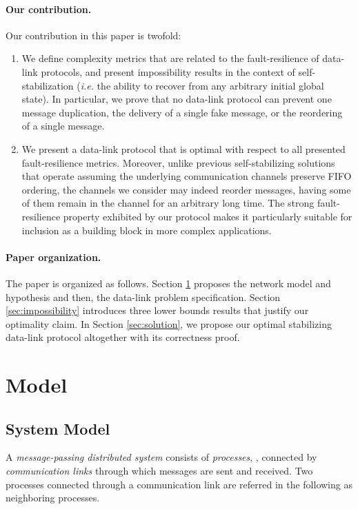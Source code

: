 \documentclass[11pt]{article}
\begin{document}
\paragraph{Our contribution.} Our contribution in this paper is twofold:
\begin{enumerate}
\item We define complexity metrics that are related to the fault-resilience of data-link protocols, and present impossibility results in the context of self-stabilization (\emph{i.e.} the ability to recover from any arbitrary initial global state). In particular, we prove that no data-link protocol can prevent one message duplication, the delivery of a single fake message, or the reordering of a single message.
\item We present a data-link protocol that is optimal with respect to all presented fault-resilience metrics. Moreover, unlike previous self-stabilizing solutions that operate assuming the underlying communication channels preserve FIFO ordering, the channels we consider may indeed reorder messages, having some of them remain in the channel for an arbitrary long time. The strong fault-resilience property exhibited by our protocol makes it particularly suitable for inclusion as a building block in more complex applications.
\end{enumerate}

\paragraph{Paper organization.} The paper is organized as follows. Section \ref{sec:model} proposes the network model and hypothesis and then, the data-link problem specification. Section \ref{sec:impossibility} introduces three lower bounds results that justify our optimality claim. In Section \ref{sec:solution}, we propose our optimal stabilizing data-link protocol altogether with its correctness proof.

\section{Model}\label{sec:model}

\subsection{System Model}

A \emph{message-passing distributed system} consists of  {\em processes}, , connected by {\em communication links} through which messages are sent and received. Two processes connected through a communication link are referred in the following as neighboring processes.
\end{document}
